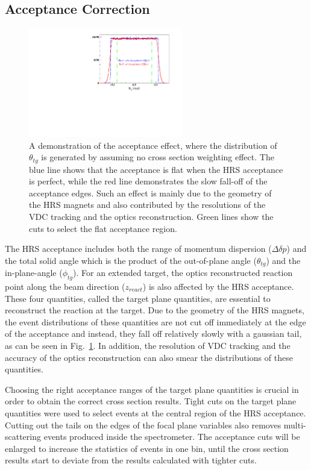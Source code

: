 \subsection{Acceptance Correction}
\begin{figure}[!ht]
  \begin{center}
    \includegraphics[type=pdf, ext=.pdf,read=.pdf,width=0.60\textwidth]{./figures/xs/accep_demo}
    \caption[A demonstration of the acceptance effect]{\footnotesize{A demonstration of the acceptance effect, where the distribution of $\theta_{tg}$ is generated by assuming no cross section weighting effect. The blue line shows that the acceptance is flat when the HRS acceptance is perfect, while the red line demonstrates the slow fall-off of the acceptance edges. Such an effect is mainly due to the geometry of the HRS magnets and also contributed by the resolutions of the VDC tracking and the optics reconstruction. Green lines show the cuts to select the flat acceptance region.}}
    \label{accp_demo}
  \end{center}
\end{figure}
 The HRS acceptance includes both the range of momentum dispersion ($\Delta\delta p$) and the total solid angle which is the product of the out-of-plane angle ($\theta_{tg}$) and the in-plane-angle ($\phi_{tg}$). For an extended target, the optics reconstructed reaction point along the beam direction ($z_{react}$) is also affected by the HRS acceptance. These four quantities, called the target plane quantities, are essential to reconstruct the reaction at the target. Due to the geometry of the HRS magnets, the event distributions of these quantities are not cut off immediately at the edge of the acceptance and instead, they fall off relatively slowly with a gaussian tail, as can be seen in Fig.~\ref{accp_demo}. In addition, the resolution of VDC tracking and the accuracy of the optics reconstruction can also smear the distributions of these quantities. 
 
 Choosing the right acceptance ranges of the target plane quantities is crucial in order to obtain the correct cross section results. Tight cuts on the target plane quantities were used to select events at the central region of the HRS acceptance. Cutting out the tails on the edges of the focal plane variables also removes multi-scattering events produced inside the spectrometer. The acceptance cuts will be enlarged to increase the statistics of events in one bin, until the cross section results start to deviate from the results calculated with tighter cuts.
 
